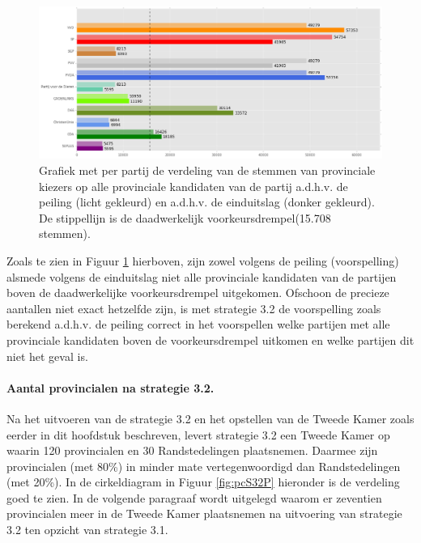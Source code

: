 \begin{figure}[H]

	\includegraphics[width=\linewidth]{stemmen_op_provincialen_eigenX_samen.png}

			\caption{Grafiek met per partij de verdeling van de stemmen van provinciale kiezers op alle provinciale kandidaten van de partij a.d.h.v. de peiling (licht gekleurd) en a.d.h.v. de einduitslag (donker gekleurd). De stippellijn is de daadwerkelijk voorkeursdrempel(15.708 stemmen).}

\label{fig:stemmenS32P}
\end{figure}

Zoals te zien in Figuur \ref{fig:stemmenS32P} hierboven, zijn zowel volgens de peiling (voorspelling) alsmede volgens de einduitslag niet alle provinciale kandidaten van de partijen boven de daadwerkelijke voorkeursdrempel uitgekomen. Ofschoon de precieze aantallen niet exact hetzelfde zijn, is met strategie 3.2 de voorspelling zoals berekend a.d.h.v. de peiling correct in het voorspellen welke partijen met alle provinciale kandidaten boven de voorkeursdrempel uitkomen en welke partijen dit niet het geval is.


\paragraph{Aantal provincialen na strategie 3.2.}
Na het uitvoeren van de strategie 3.2 en het opstellen van de Tweede Kamer zoals eerder in dit hoofdstuk beschreven, levert strategie 3.2 een Tweede Kamer op waarin 120 provincialen en 30 Randstedelingen plaatsnemen. Daarmee zijn provincialen (met 80\%) in minder mate vertegenwoordigd dan Randstedelingen (met 20\%). In de cirkeldiagram in Figuur \ref{fig:pcS32P} hieronder is de verdeling goed te zien. In de volgende paragraaf wordt uitgelegd waarom er zeventien provincialen meer in de Tweede Kamer plaatsnemen na uitvoering van strategie 3.2 ten opzicht van strategie 3.1.

